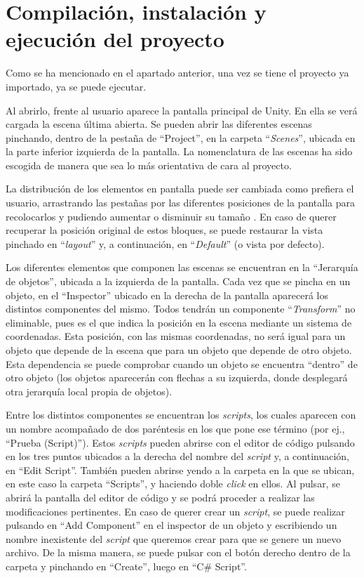 \section{Compilación, instalación y ejecución del proyecto}

Como se ha mencionado en el apartado anterior, una vez se tiene el proyecto ya importado, ya se puede ejecutar.

Al abrirlo, frente al usuario aparece la pantalla principal de Unity. En ella se verá cargada la escena última abierta. Se pueden abrir las diferentes escenas pinchando, dentro de la pestaña de ``Project'', en la carpeta ``\textit{Scenes}'', ubicada en la parte inferior izquierda de la pantalla. La nomenclatura de las escenas ha sido escogida de manera que sea lo más orientativa de cara al proyecto. 

La distribución de los elementos en pantalla puede ser cambiada como prefiera el usuario, arrastrando las pestañas por las diferentes posiciones de la pantalla para recolocarlos y pudiendo aumentar o disminuir su tamaño . En caso de querer recuperar la posición original de estos bloques, se puede restaurar la vista pinchado en ``\textit{layout}'' y, a continuación, en ``\textit{Default}'' (o vista por defecto).

Los diferentes elementos que componen las escenas se encuentran en la ``Jerarquía de objetos'', ubicada a la izquierda de la pantalla. Cada vez que se pincha en un objeto, en el ``Inspector'' ubicado en la derecha de la pantalla aparecerá los distintos componentes del mismo. Todos tendrán un componente ``\textit{Transform}'' no eliminable, pues es el que indica la posición en la escena mediante un sistema de coordenadas. Esta posición, con las mismas coordenadas, no será igual para un objeto que depende de la escena que para un objeto que depende de otro objeto. Esta dependencia se puede comprobar cuando un objeto se encuentra ``dentro'' de otro objeto (los objetos aparecerán con flechas a su izquierda, donde desplegará otra jerarquía local propia de objetos).

Entre los distintos componentes se encuentran los \textit{scripts}, los cuales aparecen con un nombre acompañado de dos paréntesis en los que pone ese término (por ej., ``Prueba (Script)''). Estos \textit{scripts} pueden abrirse con el editor de código pulsando en los tres puntos ubicados a la derecha del nombre del \textit{script} y, a continuación, en ``Edit Script''. También pueden abrirse yendo a la carpeta en la que se ubican, en este caso la carpeta ``Scripts'', y haciendo doble \textit{click} en ellos. Al pulsar, se abrirá la pantalla del editor de código y se podrá proceder a realizar las modificaciones pertinentes. En caso de querer crear un \textit{script}, se puede realizar pulsando en ``Add Component'' en el inspector de un objeto y escribiendo un nombre inexistente del \textit{script} que queremos crear para que se genere un nuevo archivo. De la misma manera, se puede pulsar con el botón derecho dentro de la carpeta y pinchando en ``Create'', luego en ``C\# Script''.

